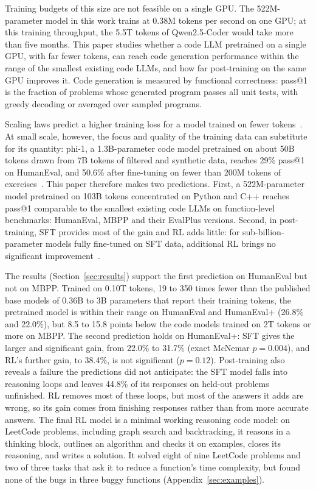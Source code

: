 \documentclass[sigconf,nonacm,balance=false]{acmart}
\begin{document}
Training budgets of this size are not feasible on a single GPU. The 522M-parameter model in this work trains at 0.38M
tokens per second on one GPU; at this training throughput, the 5.5T tokens of Qwen2.5-Coder would take more than five
months. This paper studies whether a code LLM pretrained on a single GPU, with far fewer tokens, can reach code
generation performance within the range of the smallest existing code LLMs, and how far post-training on the same GPU
improves it. Code generation is measured by functional correctness: pass@1 is the fraction of problems whose
generated program passes all unit tests, with greedy decoding or averaged over sampled programs.

Scaling laws predict a higher training loss for a model trained on fewer tokens~\cite{kaplan2020scaling}. At small
scale, however, the focus and quality of the training data can substitute for its quantity: phi-1, a 1.3B-parameter
code model pretrained on about 50B tokens drawn from 7B tokens of filtered and synthetic data, reaches 29\% pass@1 on
HumanEval, and 50.6\% after fine-tuning on fewer than 200M tokens of exercises~\cite{gunasekar2023textbooks}. This
paper therefore makes two predictions. First, a 522M-parameter model pretrained on 103B tokens concentrated on Python
and C++ reaches pass@1 comparable to the smallest existing code LLMs on function-level benchmarks: HumanEval, MBPP and
their EvalPlus versions. Second, in post-training, SFT provides
most of the gain and RL adds little: for sub-billion-parameter models fully fine-tuned on SFT data, additional RL
brings no significant improvement~\cite{zhao2025mobilellmr1}.

The results (Section~\ref{sec:results}) support the first prediction on HumanEval but not on MBPP. Trained on 0.10T
tokens, 19 to 350 times fewer than the published base models of 0.36B to 3B parameters that report their training
tokens, the pretrained model is within their range on HumanEval and HumanEval+ (26.8\% and 22.0\%), but 8.5 to 15.8
points below the code models trained on 2T tokens or more on MBPP. The second prediction holds on HumanEval+: SFT
gives the larger and significant gain, from 22.0\% to 31.7\% (exact McNemar $p = 0.004$), and RL's further gain, to
38.4\%, is not significant ($p = 0.12$).
Post-training also reveals a failure the predictions did not anticipate: the SFT model falls into reasoning loops and
leaves 44.8\% of its responses on held-out problems unfinished. RL removes most of these loops, but most of the answers
it adds are wrong, so its gain comes from finishing responses rather than from more accurate answers.
The final RL model is a minimal working reasoning code model: on LeetCode problems, including graph search and
backtracking, it reasons in a thinking block, outlines an algorithm and checks it on examples, closes its reasoning,
and writes a solution. It solved eight of nine LeetCode problems and two of three tasks that ask it to reduce a
function's time complexity, but found none of the bugs in three buggy functions (Appendix~\ref{sec:examples}).
\end{document}
